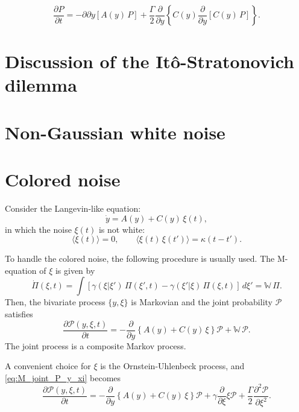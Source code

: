 \documentclass{book}
\numberwithin{equation}{section}
\theoremstyle{plain}
\theoremstyle{definition}
\theoremstyle{remark}
\theoremstyle{BoldStyle}
\numberwithin{exercise}{section}
\begin{document}
$$
\frac{ \partial P }{ \partial t }
=
-{ \partial } { \partial y } [ A(y) \, P ]
+
\frac{ \Gamma } { 2 } \frac{ \partial } { \partial y }
\left\{
  C(y)
  \frac{ \partial } { \partial y } [ C(y) \, P ]
\right\}.
$$

\section{Discussion of the It\^o-Stratonovich dilemma}

\section{Non-Gaussian white noise}

\section{Colored noise}

Consider the Langevin-like equation:
\begin{equation}
  \dot y = A(y) + C(y) \, \xi(t),
  \label{eq:Langevin_colored}
\end{equation}
in which the noise $\xi(t)$ is not white:
\begin{equation}
\langle \xi(t) \rangle = 0,
\qquad
\langle \xi(t) \, \xi(t') \rangle = \kappa(t - t').
\label{eq:colored_noise}
\end{equation}


To handle the colored noise, the following procedure
is usually used.
%
The M-equation of $\xi$ is given by
\begin{equation}
  \dot \Pi(\xi, t)
  =
  \int \left[
    \gamma(\xi|\xi') \, \Pi(\xi', t)
    -
    \gamma(\xi'|\xi) \, \Pi(\xi, t)
  \right] \, d\xi'
  =
  \mathbb{W} \, \Pi.
\end{equation}
Then,
the bivariate process $\{ y, \xi \}$ is Markovian
and the joint probability $\mathscr P$ satisfies
\begin{equation}
  \frac{ \partial \mathscr P(y, \xi, t) }{ \partial t }
  =
  - \frac{ \partial } { \partial y }
  \left\{
    A(y) + C(y) \, \xi
  \right\} \mathscr P
  +
  \mathbb W \, \mathscr P.
  \label{eq:M_joint_P_y_xi}
\end{equation}
The joint process is a composite Markov process.


A convenient choice for $\xi$ is the Ornstein-Uhlenbeck process,
and \eqref{eq:M_joint_P_y_xi} becomes
\begin{equation}
  \frac{ \partial \mathscr P(y, \xi, t) }{ \partial t }
  =
  - \frac{ \partial } { \partial y }
  \left\{
    A(y) + C(y) \, \xi
  \right\} \mathscr P
  +
  \gamma \frac{ \partial } { \partial \xi } \xi \mathscr P
  +\frac{ \Gamma } { 2 }
  \frac{ \partial^2 \mathscr P } { \partial \xi^2 }.
  \label{eq:FP_joint_y_xi}
\end{equation}
\end{document}
